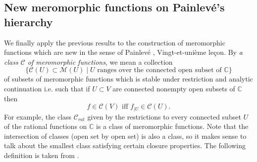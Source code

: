 \documentclass[12pt]{amsart}
\theoremstyle{definition}
\theoremstyle{plain}
\theoremstyle{exampstyle}
\theoremstyle{exampstyle}\newtheorem{thmxbis}{Theorem}
\numberwithin{equation}{section}
\theoremstyle{remark}
\begin{document}
\subsection{New meromorphic functions on Painlevé's hierarchy} We finally apply the previous results to the construction of meromorphic functions which are new in the sense of Painlevé \cite{Painleve}, Vingt-et-unième leçon. By {\em a class $\mathcal C$ of meromorphic functions}, we mean a collection 
$$\lbrace \mathcal C(U) \subset \mathcal M(U) \mid U \text{ ranges over the connected open subset of } \mathbb{C} \rbrace$$
of subsets of meromorphic functions which is stable under restriction and analytic continuation i.e. such that if $U \subset V$ are connected nonempty open subsets of $\mathbb{C}$ then 
$$ f \in \mathcal C(V) \text{ iff } f_{\mid U} \in \mathcal C(U).$$
For example, the class $\mathcal C_{rat}$ given by the restrictions to every connected subset $U$ of the rational functions on $\mathbb{C}$ is a class of meromorphic functions. Note that the intersection of classes (open set by open set) is also a class, so it makes sense to talk about the smallest class satisfying certain closure properties. The following definition is taken from \cite{Umemura}.
\end{document}
